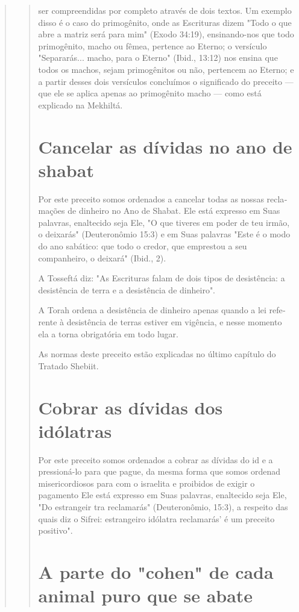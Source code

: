\begin{quote}
\begin{quote}
ser compreendidas por completo através de dois textos. Um exemplo disso
é o caso do primogênito, onde as Escrituras dizem "Todo o que abre a
matriz será para mim" (Exodo 34:19), ensinando-nos que todo primogênito,
macho ou fêmea, pertence ao Eterno; o versículo "Separarás... macho,
para o Eterno" (Ibid., 13:12) nos ensina que todos os machos, sejam
primogênitos ou não, per­tencem ao Eterno; e a partir desses dois
versículos concluímos o significado do preceito --- que ele se aplica
apenas ao primogênito macho --- como está explicado na Mekhiltá.

\section{Cancelar as dívidas no ano de shabat}

Por este preceito somos ordenados a cancelar todas as nossas
recla­mações de dinheiro no Ano de Shabat. Ele está expresso em Suas
palavras, enal­tecido seja Ele, "O que tiveres em poder de teu irmão, o
deixarás" (Deuteronô­mio 15:3) e em Suas palavras "Este é o modo do ano
sabático: que todo o cre­dor, que emprestou a seu companheiro, o
deixará" (Ibid., 2).

A Tosseftá diz: "As Escrituras falam de dois tipos de desistência: a
desistência de terra e a desistência de dinheiro".

A Torah ordena a desistência de dinheiro apenas quando a lei refe­rente
à desistência de terras estiver em vigência, e nesse momento ela a torna
obrigatória em todo lugar.

As normas deste preceito estão explicadas no último capítulo do Tra­tado
Shebiit.

\section{Cobrar as dívidas dos idólatras}

Por este preceito somos ordenados a cobrar as dívidas do id e a
pressioná-lo para que pague, da mesma forma que somos ordenad
misericordiosos para com o israelita e proibidos de exigir o pagamento
Ele está expresso em Suas palavras, enaltecido seja Ele, "Do estrangeir
tra reclamarás" (Deuteronômio, 15:3), a respeito das quais diz o Sifrei:
estrangeiro idólatra reclamarás' é um preceito positivo".

\section{A parte do "cohen" de cada animal puro que se abate}


\end{quote}
\end{quote}

